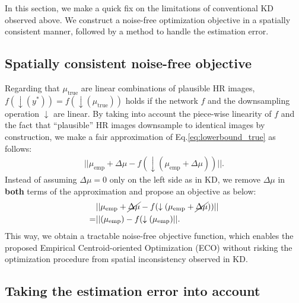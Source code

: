 \documentclass[letterpaper]{article} %
\begin{document}
In this section, we make a quick fix on the limitations of conventional KD observed above. We construct a noise-free optimization objective in a spatially consistent manner, followed by a method to handle the estimation error.

\subsection{Spatially consistent noise-free objective}
Regarding that $\mu_{\text{true}}$ are linear combinations of plausible HR images, $f(\downarrow(y^*))=f(\downarrow(\mu_{\text{true}}))$ holds if the network $f$ and the downsampling operation $\downarrow$ are linear. By taking into account the piece-wise linearity \cite{PiecewiseLinear} of $f$ and the fact that ``plausible'' HR images downsample to identical images by construction, we make a fair approximation of Eq.\eqref{eq:lowerbound_true} as follows:
\begin{equation}
    \label{eq:lowerbound_withlinearity_}
    \begin{aligned}
        ||\mu_{\text{emp}} + \Delta\mu - f(\downarrow(\mu_{\text{emp}} + \Delta\mu))||
        .
    \end{aligned}
\end{equation}
Instead of assuming $\Delta\mu=0$ only on the left side as in KD, we remove $\Delta\mu$ in \textbf{both} terms of the approximation and propose an objective as below:
\begin{equation}
    \label{eq:train_with_sr}
    \begin{aligned}
        &||\mu_{\text{emp}} + \cancel{\Delta\mu} - f(\downarrow(\mu_{\text{emp}} + \cancel{\Delta\mu}))|| \\
         =&||(\mu_{\text{emp}}) - f(\downarrow(\mu_{\text{emp}})||
         .
    \end{aligned}
\end{equation}
This way, we obtain a tractable noise-free objective function, which enables the proposed Empirical Centroid-oriented Optimization (ECO) without risking the optimization procedure from spatial inconsistency observed in KD.

\subsection{Taking the estimation error into account}\label{section:mixup_as_rescue}
\end{document}
